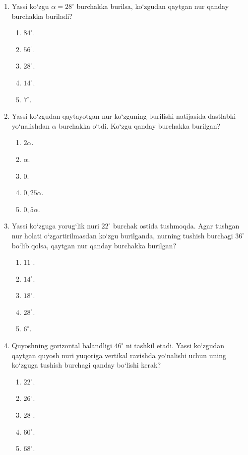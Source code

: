 \begin{enumerate}
\item Yassi ko‘zgu $\alpha=28^\circ$ burchakka burilsa, ko‘zgudan qaytgan nur qanday burchakka buriladi?
\begin{enumerate}[label=\Alph*)]
\item $84^\circ$.
\item $56^\circ$.
\item $28^\circ$.
\item $14^\circ$.
\item $7^\circ$.
\end{enumerate}

\item Yassi ko‘zgudan qaytayotgan nur ko‘zguning burilishi natijasida dastlabki yo‘nalishdan $\alpha$ burchakka o‘tdi. Ko‘zgu qanday burchakka burilgan?
\begin{enumerate}[label=\Alph*)]
\item $2\alpha$.
\item $\alpha$.
\item 0.
\item $0,25\alpha$.
\item $0,5\alpha$.
\end{enumerate}

\item Yassi ko‘zguga yorug‘lik nuri $22^\circ$ burchak ostida tushmoqda. Agar tushgan nur holati o‘zgartirilmasdan ko‘zgu burilganda, nurning tushish burchagi $36^\circ$ bo‘lib qolsa, qaytgan nur qanday burchakka burilgan?
\begin{enumerate}[label=\Alph*)]
\item $11^\circ$.
\item $14^\circ$.
\item $18^\circ$.
\item $28^\circ$.
\item $6^\circ$.
\end{enumerate}

\item Quyoshning gorizontal balandligi $46^\circ$ ni tashkil etadi. Yassi ko‘zgudan qaytgan quyosh nuri yuqoriga vertikal ravishda yo‘nalishi uchun uning ko‘zguga tushish burchagi qanday bo‘lishi kerak?
\begin{enumerate}[label=\Alph*)]
\item $22^\circ$.
\item $26^\circ$.
\item $28^\circ$.
\item $60^\circ$.
\item $68^\circ$.
\end{enumerate}


\end{enumerate}
